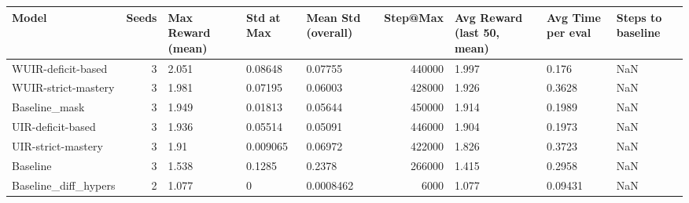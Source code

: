 \begin{adjustbox}{max width=\linewidth}
\begin{tabular}{lrlllrlll}
\toprule
Model & Seeds & Max Reward (mean) & Std at Max & Mean Std (overall) & Step@Max & Avg Reward (last 50, mean) & Avg Time per eval & Steps to baseline \\
\midrule
WUIR-deficit-based & 3 & 2.051 & 0.08648 & 0.07755 & 440000 & 1.997 & 0.176 & NaN \\
WUIR-strict-mastery & 3 & 1.981 & 0.07195 & 0.06003 & 428000 & 1.926 & 0.3628 & NaN \\
Baseline\_mask & 3 & 1.949 & 0.01813 & 0.05644 & 450000 & 1.914 & 0.1989 & NaN \\
UIR-deficit-based & 3 & 1.936 & 0.05514 & 0.05091 & 446000 & 1.904 & 0.1973 & NaN \\
UIR-strict-mastery & 3 & 1.91 & 0.009065 & 0.06972 & 422000 & 1.826 & 0.3723 & NaN \\
Baseline & 3 & 1.538 & 0.1285 & 0.2378 & 266000 & 1.415 & 0.2958 & NaN \\
Baseline\_diff\_hypers & 2 & 1.077 & 0 & 0.0008462 & 6000 & 1.077 & 0.09431 & NaN \\
\bottomrule
\end{tabular}
\end{adjustbox}
